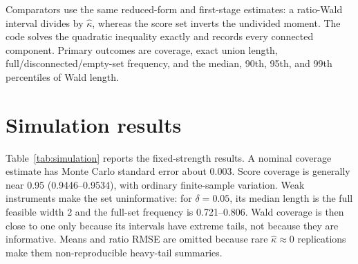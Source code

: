\documentclass[
  10pt,
  letterpaper,
]{article}
\begin{document}
Comparators use the same reduced-form and first-stage estimates: a
ratio-Wald interval divides by $\widehat\kappa$, whereas the score set
inverts the undivided moment. The code solves the quadratic inequality
exactly and records every connected component. Primary outcomes are
coverage, exact union length, full/disconnected/empty-set frequency,
and the median, 90th, 95th, and 99th percentiles of Wald length.

\section{Simulation results}

Table~\ref{tab:simulation} reports the fixed-strength results. A nominal
coverage estimate has Monte Carlo standard error about 0.003. Score
coverage is generally near 0.95 (0.9446--0.9534), with ordinary
finite-sample variation. Weak instruments make the set uninformative:
for $\delta=0.05$, its median length is the full feasible width 2 and
the full-set frequency is 0.721--0.806. Wald coverage is then close to
one only because its intervals have extreme tails, not because they are
informative. Means and ratio RMSE are omitted because rare
$\widehat\kappa\approx0$ replications make them non-reproducible
heavy-tail summaries.
\end{document}
